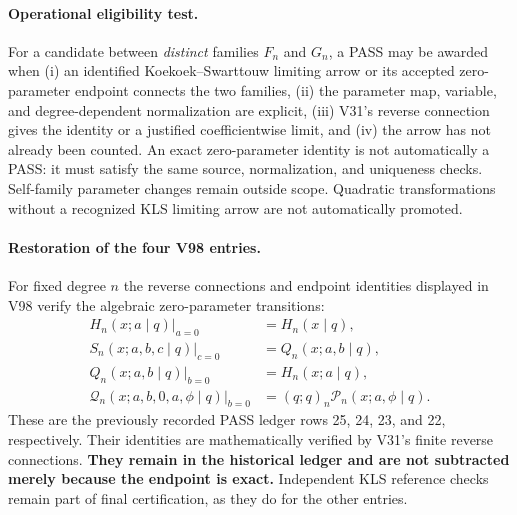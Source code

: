 \documentclass[11pt]{article}
\begin{document}
\paragraph{Operational eligibility test.} For a candidate between \emph{distinct} families $F_n$ and $G_n$, a PASS may be awarded when (i) an identified Koekoek--Swarttouw limiting arrow or its accepted zero-parameter endpoint connects the two families, (ii) the parameter map, variable, and degree-dependent normalization are explicit, (iii) V31's reverse connection gives the identity or a justified coefficientwise limit, and (iv) the arrow has not already been counted. An exact zero-parameter identity is not automatically a PASS: it must satisfy the same source, normalization, and uniqueness checks. Self-family parameter changes remain outside scope. Quadratic transformations without a recognized KLS limiting arrow are not automatically promoted.

\paragraph{Restoration of the four V98 entries.} For fixed degree $n$ the reverse connections and endpoint identities displayed in V98 verify the algebraic zero-parameter transitions:
\begin{align*}
H_n(x;a\mid q)\big|_{a=0}&=H_n(x\mid q),\\
S_n(x;a,b,c\mid q)\big|_{c=0}&=Q_n(x;a,b\mid q),\\
Q_n(x;a,b\mid q)\big|_{b=0}&=H_n(x;a\mid q),\\
\mathscr Q_n(x;a,b,0,a,\phi\mid q)\big|_{b=0}&=(q;q)_n\mathscr P_n(x;a,\phi\mid q).
\end{align*}
These are the previously recorded PASS ledger rows 25, 24, 23, and 22, respectively. Their identities are mathematically verified by V31's finite reverse connections. \textbf{They remain in the historical ledger and are not subtracted merely because the endpoint is exact.} Independent KLS reference checks remain part of final certification, as they do for the other entries.
\end{document}
